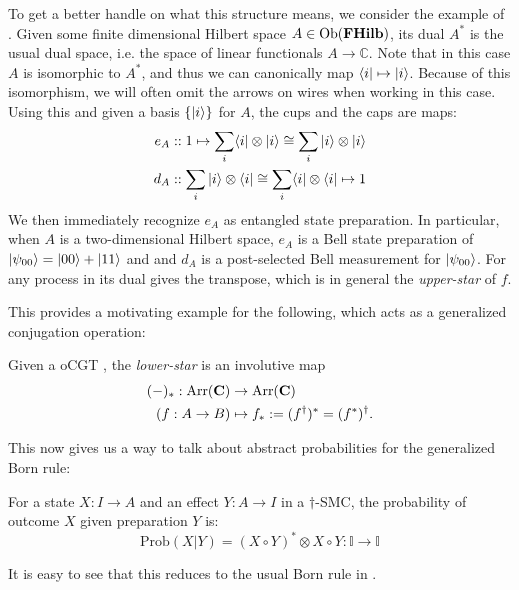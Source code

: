 \begin{example}
\label{ex:bellduals}
To get a better handle on what this structure means, we consider the example of . Given some finite dimensional Hilbert space $A\in\mbox{Ob}(\mathbf{FHilb})$, its dual $A^*$ is the usual dual space, i.e. the space of linear functionals $A\to \mathbb{C}$. Note that in this case $A$ is isomorphic to $A^*$, and thus we can canonically map $\langle i |\mapsto| i \rangle$. Because of this isomorphism, we will often omit the arrows on wires when working in this case. Using this and given a basis $\{ | i \rangle \}$ for $A$, the cups and the caps are maps:
\begin{align}
e_A &:: 1\mapsto \sum_i\langle i |\otimes| i \rangle\cong\sum_i| i \rangle\otimes| i \rangle
\\
d_A &:: \sum_i| i \rangle\otimes\langle i |\cong\sum_i\langle i |\otimes\langle i | \mapsto 1
\end{align}
We then immediately recognize $e_A$ as entangled state preparation. In particular, when $A$ is a two-dimensional Hilbert space, $e_A$ is a Bell state preparation of $| \psi_{00} \rangle=| 00 \rangle+| 11 \rangle$ and  and $d_A$ is a post-selected Bell measurement for $| \psi_{00} \rangle$. For any process in  its dual gives the transpose, which is in general the \emph{upper-star} of $f$.
\end{example}

This provides a motivating example for the following, which acts as a generalized conjugation operation:

\begin{defn}
Given a oCGT , the \emph{lower-star} is an involutive map 
\begin{align*}
(-)_*:\mbox{Arr}(\mathbf{C})&\to\mbox{Arr}(\mathbf{C}) \\
\left(f:A\to B\right) &\mapsto f_*:=(f^\dagger)^*=(f^*)^\dagger.
\end{align*}
\end{defn}

This now gives us a way to talk about abstract probabilities for the generalized Born rule:
\begin{defn}
For a state $X:I\to A$ and an effect $Y:A\to I$ in a $\dagger$-SMC, the probability of outcome $X$ given preparation $Y$ is:
\begin{equation}
\mbox{Prob}(X|Y) = (X\circ Y)^*\otimes X\circ Y:\mathbb{I}\to\mathbb{I}
\end{equation}
\end{defn}
\noindent It is easy to see that this reduces to the usual Born rule in .

